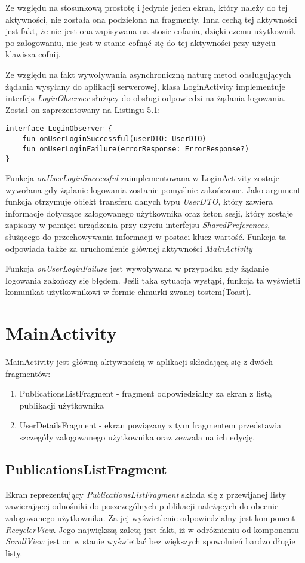 \documentclass[a4paper,12pt,twoside,openany]{report}
\begin{document}
Ze względu na stosunkową prostotę i jedynie jeden ekran, który należy do tej aktywności, nie została ona podzielona na fragmenty. Inna cechą tej aktywności jest fakt, że nie jest ona zapisywana na stosie cofania, dzięki czemu użytkownik po zalogowaniu, nie jest w stanie cofnąć się do tej aktywności przy użyciu klawisza cofnij.

 Ze względu na fakt wywoływania asynchroniczną naturę metod obsługujących żądania wysyłany do aplikacji serwerowej, klasa LoginActivity implementuje interfejs \textit{LoginObserver} służący do obsługi odpowiedzi na żądania logowania. Został on zaprezentowany na Listingu 5.1:
 \begin{lstlisting}[caption=Interfejs LoginObserver,label=code1,captionpos=b]
interface LoginObserver {
	fun onUserLoginSuccessful(userDTO: UserDTO)  
	fun onUserLoginFailure(errorResponse: ErrorResponse?)
}
 \end{lstlisting} 


Funkcja \textit{onUserLoginSuccessful} zaimplementowana w LoginActivity zostaje wywołana gdy żądanie logowania zostanie pomyślnie zakończone. Jako argument funkcja otrzymuje obiekt transferu danych typu \textit{UserDTO}, który zawiera informacje dotyczące zalogowanego użytkownika oraz żeton sesji, który zostaje zapisany w pamięci urządzenia przy użyciu interfejsu \textit{SharedPreferences}, służącego do przechowywania informacji w postaci klucz-wartość. Funkcja ta odpowiada także za uruchomienie głównej aktywności \textit{MainActivity}

Funkcja \textit{onUserLoginFailure} jest wywoływana w przypadku gdy żądanie logowania zakończy się błędem. Jeśli taka sytuacja wystąpi, funkcja ta wyświetli komunikat użytkownikowi w formie chmurki zwanej tostem(Toast).

\section{MainActivity}
MainActivity jest główną aktywnością w aplikacji składającą się z dwóch fragmentów: 
\begin{enumerate}
	\item PublicationsListFragment - fragment odpowiedzialny za ekran z listą publikacji użytkownika
	\item UserDetailsFragment - ekran powiązany z tym fragmentem przedstawia szczegóły zalogowanego użytkownika oraz zezwala na ich edycję.
\end{enumerate}

\subsection{PublicationsListFragment}
Ekran reprezentujący \textit{PublicationsListFragment} składa się z przewijanej listy zawierającej odnośniki do poszczególnych publikacji należących do obecnie zalogowanego użytkownika. Za jej wyświetlenie odpowiedzialny jest komponent \textit{RecyclerView}. Jego największą zaletą jest fakt, iż w odróżnieniu od komponentu \textit{ScrollView} jest on w stanie wyświetlać bez większych spowolnień bardzo długie listy. 
\end{document}
